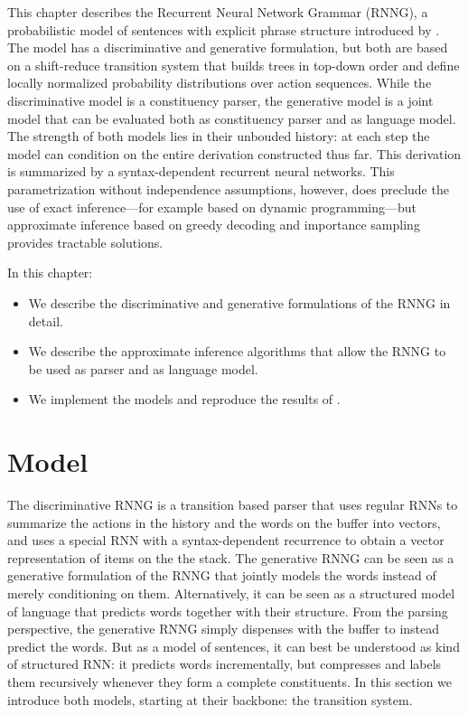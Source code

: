 This chapter describes the Recurrent Neural Network Grammar (RNNG), a probabilistic model of sentences with explicit phrase structure introduced by \citet{dyer2016rnng}. The model has a discriminative and generative formulation, but both are based on a shift-reduce transition system that builds trees in top-down order and define locally normalized probability distributions over action sequences. While the discriminative model is a constituency parser, the generative model is a joint model that can be evaluated both as constituency parser and as language model. The strength of both models lies in their unbouded history: at each step the model can condition on the entire derivation constructed thus far. This derivation is summarized by a syntax-dependent recurrent neural networks. This parametrization without independence assumptions, however, does preclude the use of exact inference---for example based on dynamic programming---but approximate inference based on greedy decoding and importance sampling provides tractable solutions.

In this chapter:
\begin{itemize}
  \item We describe the discriminative and generative formulations of the RNNG in detail.
  \item We describe the approximate inference algorithms that allow the RNNG to be used as parser and as language model.
  \item We implement the models and reproduce the results of \citet{dyer2016rnng}.
\end{itemize}

\section{Model}
  The discriminative RNNG is a transition based parser that uses regular RNNs to summarize the actions in the history and the words on the buffer into vectors, and uses a special RNN with a syntax-dependent recurrence to obtain a vector representation of items on the the stack. The generative RNNG can be seen as a generative formulation of the RNNG that jointly models the words instead of merely conditioning on them. Alternatively, it can be seen as a structured model of language that predicts words together with their structure. From the parsing perspective, the generative RNNG simply dispenses with the buffer to instead predict the words. But as a model of sentences, it can best be understood as kind of structured RNN: it predicts words incrementally, but compresses and labels them recursively whenever they form a complete constituents. In this section we introduce both models, starting at their backbone: the transition system.


